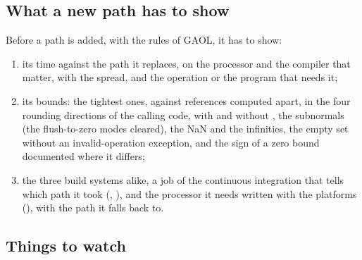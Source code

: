 \subsection{What a new path has to show}

Before a path is added, with the rules of GAOL, it has to show:
\begin{enumerate}
\item its time against the path it replaces, on the processor and the
compiler that matter, with the spread, and the operation or the program
that needs it;
\item its bounds: the tightest ones, against references computed apart, in
the four rounding directions of the calling code, with and without
, the subnormals (the flush-to-zero modes
cleared), the NaN and the infinities, the empty set without an
invalid-operation exception, and the sign of a zero bound documented where
it differs;
\item the three build systems alike, a job of the continuous integration
that tells which path it took (,
), and the processor it needs written with the platforms
(), with the path it falls back to.
\end{enumerate}

\subsection{Things to watch}

